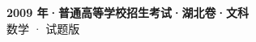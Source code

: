 \documentclass[zihao=-4, a4paper]{ctexart}
\begin{document}
\begin{center}
  {\Large\bfseries 2009 年·普通高等学校招生考试·湖北卷·文科}\\[4pt]
  {\large 数学 · 试题版}
\end{center}
\medskip
{}

\end{document}
